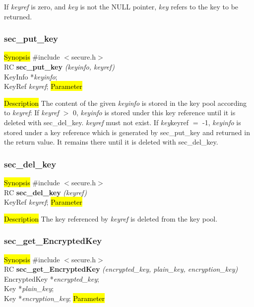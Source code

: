 If {\em keyref} is zero, and {\em key} is not the NULL pointer, {\em key}
refers to the key to be returned.

\subsubsection{sec\_put\_key}
\label{sec_put_key}
\hl{Synopsis}
\#include $<$secure.h$>$ \\ [0.5cm]
RC {\bf sec\_put\_key} {\em (keyinfo, keyref)} \\
KeyInfo *{\em keyinfo}; \\
KeyRef {\em keyref};
\hl{Parameter}


\hl{Description}
The content of the given {\em keyinfo} is stored in the key pool according to {\em keyref}: 
\be
\m If {\em keyref} $>$ 0, {\em keyinfo} is stored under this key reference until it is
   deleted with sec\_del\_key. {\em keyref} must not exist.
\m If {\em key}\pf keyref $=$ -1, {\em keyinfo} is stored under a key reference which is generated 
   by sec\_put\_key and returned in the return value. It remains there until it is deleted
   with sec\_del\_key.
\ee

\subsubsection{sec\_del\_key}
\label{sec_del_key}
\hl{Synopsis}
\#include $<$secure.h$>$ \\ [0.5cm]
RC {\bf sec\_del\_key} {\em (keyref)} \\
KeyRef {\em keyref};
\hl{Parameter}

\hl{Description}
The key referenced by {\em keyref} is deleted from the key pool.

\subsubsection{sec\_get\_EncryptedKey}
\label{sec_get_enc_key}
\hl{Synopsis}
\#include $<$secure.h$>$ \\ [0.5cm]
RC {\bf sec\_get\_EncryptedKey} {\em (encrypted\_key, plain\_key, encryption\_key)} \\
EncryptedKey *{\em encrypted\_key}; \\
Key *{\em plain\_key}; \\
Key *{\em encryption\_key};
\hl{Parameter}

